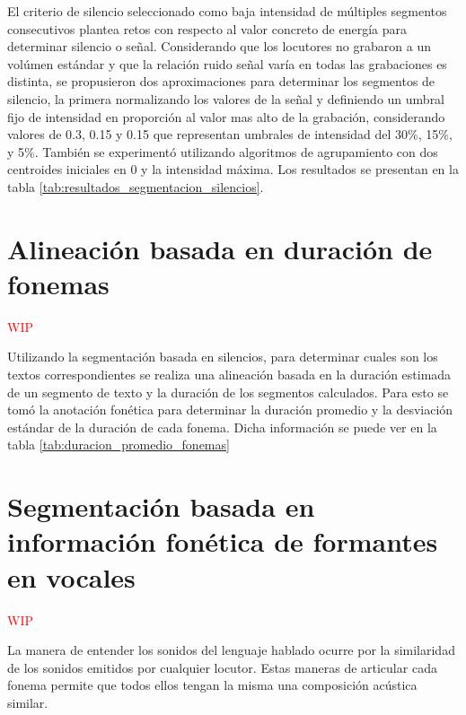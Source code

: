 El criterio de silencio seleccionado como baja intensidad de múltiples segmentos consecutivos plantea retos con respecto al valor concreto de energía para determinar silencio o señal. Considerando que los locutores no grabaron a un volúmen estándar y que la relación ruido señal varía en todas las grabaciones es distinta, se propusieron dos aproximaciones para determinar los segmentos de silencio, la primera normalizando los valores de la señal y definiendo un umbral fijo de intensidad en proporción al valor mas alto de la grabación, considerando valores de 0.3, 0.15 y 0.15 que representan umbrales de intensidad del 30\%, 15\%, y 5\%. También se experimentó utilizando algoritmos de agrupamiento con dos centroides iniciales en 0 y la intensidad máxima. Los resultados se presentan en la tabla \ref{tab:resultados_segmentacion_silencios}.




\section{Alineación basada en duración de fonemas}

\textcolor{red}{WIP}

Utilizando la segmentación basada en silencios, para determinar cuales son los textos correspondientes se realiza una alineación basada en la duración estimada de un segmento de texto y la duración de los segmentos calculados. Para esto se tomó la anotación fonética para determinar la duración promedio y la desviación estándar de la duración de cada fonema.  Dicha información se puede ver en la tabla \ref{tab:duracion_promedio_fonemas} 



\section{Segmentación basada en información fonética de formantes en vocales}
\textcolor{red}{WIP}

La manera de entender los sonidos del lenguaje hablado ocurre por  la similaridad de los sonidos emitidos por cualquier locutor. Estas maneras de articular cada fonema permite que todos ellos tengan la misma una composición acústica similar. 

